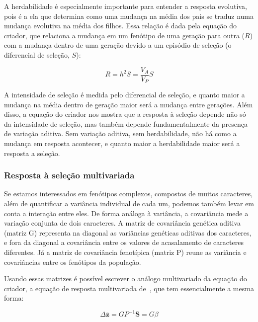 \begin{refsection}
A herdabilidade é especialmente importante para entender a resposta evolutiva,
pois é a ela que determina como uma mudança na média dos pais se traduz numa
mudança evolutiva na média dos filhos. Essa relação é dada pela equação do
criador, que relaciona a mudança em um fenótipo de uma geração para outra
($R$) com a mudança dentro de uma geração devido a um episódio de seleção (o
diferencial de seleção, $S$):

\begin{equation}
R = h^2S = \frac{V_A}{V_P}S	
\end{equation}

A intensidade de seleção é medida pelo diferencial de seleção, e quanto maior
a mudança na média dentro de geração maior será a mudança entre gerações. Além
disso, a equação do criador nos mostra que a resposta à seleção depende não só
da intensidade de seleção, mas também depende fundamentalmente da presença de
variação aditiva. Sem variação aditiva, sem herdabilidade, não há como a
mudança em resposta acontecer, e quanto maior a herdabilidade maior será a
resposta a seleção.

\subsubsection{Resposta à seleção multivariada}

Se estamos interessados em fenótipos complexos, compostos de muitos
caracteres, além de quantificar a variância individual de cada um, podemos
também levar em conta a interação entre eles. De forma análoga à variância, a
covariância mede a variação conjunta de dois caracteres. A matriz de
covariância genética aditiva (matriz G) representa na diagonal as variâncias
genéticas aditivas dos caracteres, e fora da diagonal a covariância entre os
valores de acasalamento de caracteres diferentes. Já a matriz de covariância
fenotípica (matriz P) reune as variância e covariâncias entre os fenótipos da
população.

Usando essas matrizes é possível escrever o análogo multivariado da equação do
criador, a equação de resposta multivariada de~\textcite{Lande1979-by}, que
tem essencialmente a mesma forma:

\begin{equation}
\Delta \mathbf{\overline z} = GP^{-1}\mathbf{S} = G\beta
\end{equation}


\end{refsection}
